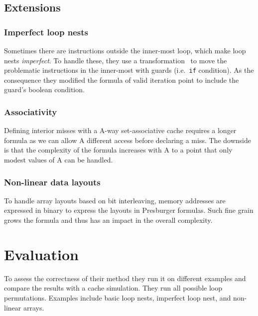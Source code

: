 \documentclass{article}
\begin{document}

\subsection{Extensions}

\subsubsection{Imperfect loop nests}
Sometimes there are instructions outside the inner-most loop, which make loop nests \textit{imperfect}.
To handle these, they use a transformation~\cite{ahmed2001synthesizing} to move the problematic instructions in the inner-most with guards (i.e.\ \texttt{if} condition).
As the consequence they modified the formula of valid iteration point to include the guard's boolean condition.

\subsubsection{Associativity}
Defining interior misses with a A-way set-associative cache requires a longer formula as we can allow A different access before declaring a miss.
The downside is that the complexity of the formula increases with A to a point that only modest values of A can be handled.

\subsubsection{Non-linear data layouts}
To handle array layouts based on bit interleaving, memory addresses are expressed in binary to express the layouts in Presburger formulas.
Such fine grain grows the formula and thus has an impact in the overall complexity.


\section{Evaluation}
\label{eval}
To assess the correctness of their method they run it on different examples and compare the results with a cache simulation.
They run all possible loop permutations.
Examples include basic loop nests, imperfect loop nest, and non-linear arrays.
\end{document}

